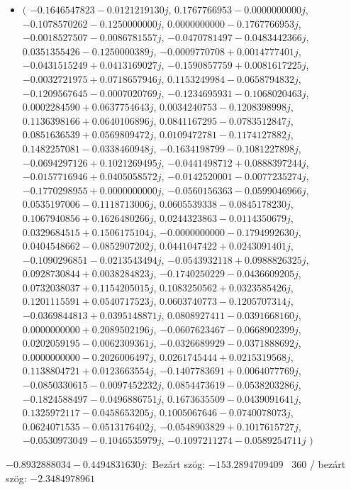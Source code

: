 \documentclass[14pt,a4paper]{article}
\begin{document}
\begin{itemize}
\item
$\big($
$-0.1646547823-0.0121219130j$, $0.1767766953-0.0000000000j$, $-0.1078570262-0.1250000000j$, $0.0000000000-0.1767766953j$, $-0.0018527507-0.0086781557j$, $-0.0470781497-0.0483442366j$, $0.0351355426-0.1250000389j$, $-0.0009770708+0.0014777401j$, $-0.0431515249+0.0413169027j$, $-0.1590857759+0.0081617225j$, $-0.0032721975+0.0718657946j$, $0.1153249984-0.0658794832j$, $-0.1209567645-0.0007020769j$, $-0.1234695931-0.1068020463j$, $0.0002284590+0.0637754643j$, $0.0034240753-0.1208398998j$, $0.1136398166+0.0640106896j$, $0.0841167295-0.0783512847j$, $0.0851636539+0.0569809472j$, $0.0109472781-0.1174127882j$, $0.1482257081-0.0338460948j$, $-0.1634198799-0.1081227898j$, $-0.0694297126+0.1021269495j$, $-0.0441498712+0.0888397244j$, $-0.0157716946+0.0405058572j$, $-0.0142520001-0.0077235274j$, $-0.1770298955+0.0000000000j$, $-0.0560156363-0.0599046966j$, $0.0535197006-0.1118713006j$, $0.0605539338-0.0845178230j$, $0.1067940856+0.1626480266j$, $0.0244323863-0.0114350679j$, $0.0329684515+0.1506175104j$, $-0.0000000000-0.1794992630j$, $0.0404548662-0.0852907202j$, $0.0441047422+0.0243091401j$, $-0.1090296851-0.0213543494j$, $-0.0543932118+0.0988826325j$, $0.0928730844+0.0038284823j$, $-0.1740250229-0.0436609205j$, $0.0732038037+0.1154205015j$, $0.1083250562+0.0323585426j$, $0.1201115591+0.0540717523j$, $0.0603740773-0.1205707314j$, $-0.0369844813+0.0395148871j$, $0.0808927411-0.0391668160j$, $0.0000000000+0.2089502196j$, $-0.0607623467-0.0668902399j$, $0.0202059195-0.0062309361j$, $-0.0326689929-0.0371888692j$, $0.0000000000-0.2026006497j$, $0.0261745444+0.0215319568j$, $0.1138804721+0.0123663554j$, $-0.1407783691+0.0064077769j$, $-0.0850330615-0.0097452232j$, $0.0854473619-0.0538203286j$, $-0.1824588497-0.0496886751j$, $0.1673635509-0.0439091641j$, $0.1325972117-0.0458653205j$, $0.1005067646-0.0740078073j$, $0.0624071535-0.0513176402j$, $-0.0548903829+0.1017615727j$, $-0.0530973049-0.1046535979j$, $-0.1097211274-0.0589254711j$
$\big)$
\end{itemize}
$-0.8932888034-0.4494831630j$:\
Bezárt szög: $-153.2894709409$ \
360 / bezárt szög: $-2.3484978961$\
\end{document}
